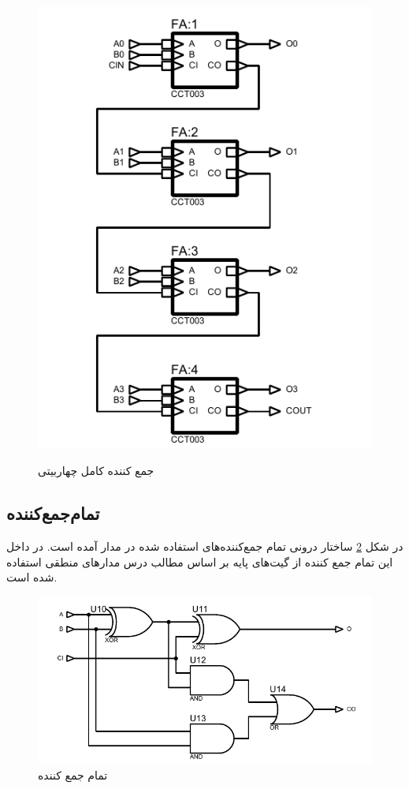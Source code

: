 \documentclass{article}
\begin{document}
\begin{figure}
	\centering
	\includegraphics[scale=0.7]{./captures/4bit}
	\label{fig:4bit}
	\caption{جمع کننده کامل چهاربیتی}
\end{figure}

\subsection{تمام‌جمع‌کننده}
در شکل \ref{fig:fa} ساختار درونی تمام جمع‌کننده‌های استفاده شده در مدار آمده است. در داخل این تمام جمع کننده‌ از گیت‌های پایه بر اساس مطالب درس مدارهای منطقی استفاده شده است.

\begin{figure}
	\centering
	\includegraphics[scale=0.7]{./captures/fa}
	\caption{تمام جمع کننده}
	\label{fig:fa}
\end{figure}
\end{document}
